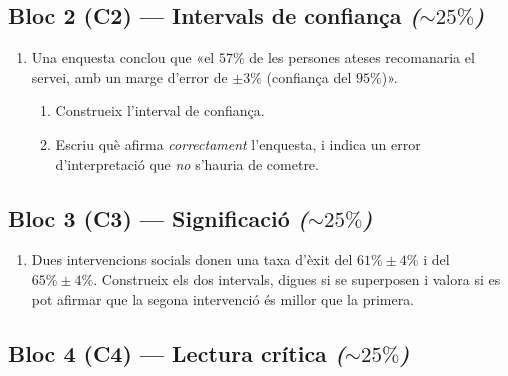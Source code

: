 \subsection*{Bloc 2 (C2) — Intervals de confiança \hfill \normalfont\itshape ($\sim 25\%$)}

\begin{enumerate}[label=\textbf{\arabic*.}, leftmargin=2em, itemsep=7pt, start=2]
  \item Una enquesta conclou que «el $57\%$ de les persones ateses recomanaria el servei,
        amb un marge d'error de $\pm 3\%$ (confiança del $95\%$)».
        \begin{enumerate}[label=\alph*), leftmargin=1.6em, topsep=2pt, itemsep=2pt]
          \item Construeix l'interval de confiança.
          \item Escriu què afirma \emph{correctament} l'enquesta, i indica un error
                d'interpretació que \emph{no} s'hauria de cometre.
        \end{enumerate}
\end{enumerate}

\subsection*{Bloc 3 (C3) — Significació \hfill \normalfont\itshape ($\sim 25\%$)}

\begin{enumerate}[label=\textbf{\arabic*.}, leftmargin=2em, itemsep=7pt, start=3]
  \item Dues intervencions socials donen una taxa d'èxit del $61\%\pm 4\%$ i del
        $65\%\pm 4\%$. Construeix els dos intervals, digues si se superposen i valora si es
        pot afirmar que la segona intervenció és millor que la primera.
\end{enumerate}

\subsection*{Bloc 4 (C4) — Lectura crítica \hfill \normalfont\itshape ($\sim 25\%$)}

